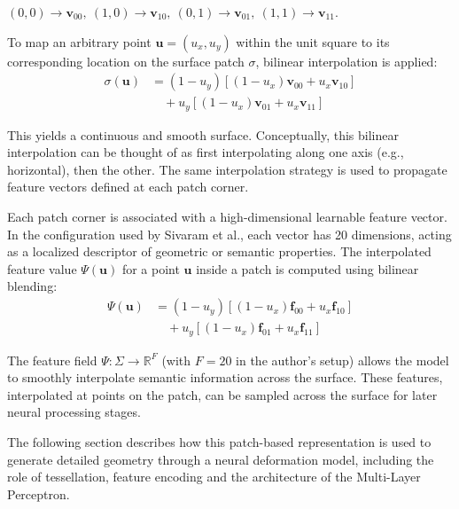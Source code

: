 $(0,0) \rightarrow \mathbf{v}_{00},\ (1,0) \rightarrow \mathbf{v}_{10},\ (0,1) \rightarrow \mathbf{v}_{01},\ (1,1) \rightarrow \mathbf{v}_{11}$.  

To map an arbitrary point $\mathbf{u} = (u_x, u_y)$ within the unit square to its corresponding location on the surface patch $\sigma$, bilinear interpolation is applied:
\begin{equation}
\begin{aligned}
\sigma(\mathbf{u}) &= (1 - u_y) \left[ (1 - u_x)\mathbf{v}_{00} + u_x \mathbf{v}_{10} \right] \\
&\quad + u_y \left[ (1 - u_x)\mathbf{v}_{01} + u_x \mathbf{v}_{11} \right]
\end{aligned}
\end{equation}

This yields a continuous and smooth surface.  
Conceptually, this bilinear interpolation can be thought of as first interpolating along one axis (e.g., horizontal), then the other.  
The same interpolation strategy is used to propagate feature vectors defined at each patch corner.  

Each patch corner is associated with a high-dimensional learnable feature vector.  
In the configuration used by Sivaram et al., each vector has 20 dimensions, acting as a localized descriptor of geometric or semantic properties.  
The interpolated feature value $\Psi(\mathbf{u})$ for a point $\mathbf{u}$ inside a patch is computed using bilinear blending:
\begin{equation}
\begin{aligned}
\Psi(\mathbf{u}) &= (1 - u_y) \left[ (1 - u_x)\mathbf{f}_{00} + u_x \mathbf{f}_{10} \right] \\
&\quad + u_y \left[ (1 - u_x)\mathbf{f}_{01} + u_x \mathbf{f}_{11} \right]
\end{aligned}
\end{equation}

The feature field $\Psi: \Sigma \rightarrow \mathbb{R}^F$ (with $F = 20$ in the author’s setup) allows the model to smoothly interpolate semantic information across the surface.  
These features, interpolated at points on the patch, can be sampled across the surface for later neural processing stages.  

The following section describes how this patch-based representation is used to generate detailed geometry through a neural deformation model, including the role of tessellation, feature encoding and the architecture of the Multi-Layer Perceptron.  

